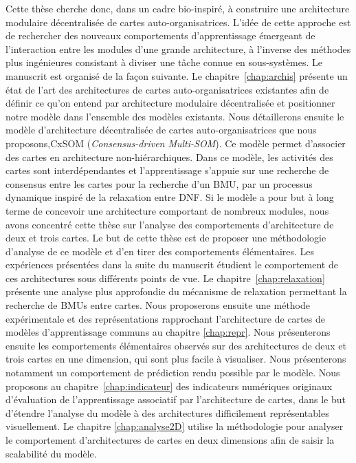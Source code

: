 Cette thèse cherche donc, dans un cadre bio-inspiré, à construire une architecture modulaire décentralisée de cartes auto-organisatrices. L'idée de cette approche est de rechercher des nouveaux comportements d'apprentissage émergeant de l'interaction entre les modules d'une grande architecture, à l'inverse des méthodes plus ingénieures consistant à diviser une tâche connue en sous-systèmes.
Le manuscrit est organisé de la façon suivante.
Le chapitre~\ref{chap:archis} présente un état de l'art des architectures de cartes auto-organisatrices existantes afin de définir ce qu'on entend par architecture modulaire décentralisée et positionner notre modèle dans l'ensemble des modèles existants.
Nous détaillerons ensuite le modèle d'architecture décentralisée de cartes auto-organisatrices que nous proposons,CxSOM (\emph{Consensus-driven Multi-SOM}).
Ce modèle permet d'associer des cartes en architecture non-hiérarchiques. Dans ce modèle, les activités des cartes sont interdépendantes et l'apprentissage s'appuie sur une recherche de consensus entre les cartes pour la recherche d'un BMU, par un processus dynamique inspiré de la relaxation entre DNF.
Si le modèle a pour but à long terme de concevoir une architecture comportant de nombreux modules, nous avons concentré cette thèse sur l'analyse des comportements d'architecture de deux et trois cartes.
Le but de cette thèse est de proposer une méthodologie d'analyse de ce modèle et d'en tirer des comportements élémentaires.
Les expériences présentées dans la suite du manuscrit étudient le comportement de ces architectures sous différents points de vue.
Le chapitre~\ref{chap:relaxation} présente une analyse plus approfondie du mécanisme de relaxation permettant la recherche de BMUs entre cartes.
Nous proposerons ensuite une méthode expérimentale et des représentations rapprochant l'architecture de cartes de modèles d'apprentissage communs au chapitre \ref{chap:repr}.
Nous présenterons ensuite les comportements élémentaires observés sur des architectures de deux et trois cartes en une dimension, qui sont plus facile à visualiser. 
Nous présenterons notamment un comportement de prédiction rendu possible par le modèle.
Nous proposons au chapitre~\ref{chap:indicateur} des indicateurs numériques originaux d'évaluation de l'apprentissage associatif par l'architecture de cartes, dans le but d'étendre l'analyse du modèle à des architectures difficilement représentables visuellement.
Le chapitre \ref{chap:analyse2D} utilise la méthodologie pour analyser le comportement d'architectures de cartes en deux dimensions afin de saisir la scalabilité du modèle.












